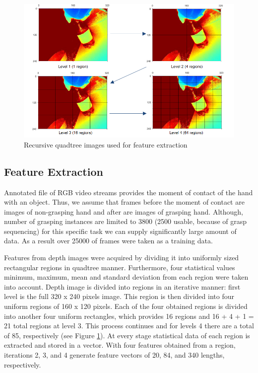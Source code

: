 \documentclass[journal]{IEEEtran}
\begin{document}
\begin{figure}
\includegraphics[scale = 1.09]{Mining}
\caption{Recursive quadtree images used for feature extraction }
\label{fig:Mining}
\centering
\end{figure}



\subsection{Feature Extraction}

Annotated file of RGB video streams provides the moment of contact of the hand with an object. Thus, we assume that frames before the moment of contact are images of non-grasping hand and after are images of grasping hand. Although, number of grasping instances are limited to 3800 (2500 usable, because of grasp sequencing) for this specific task we can supply significantly large amount of data. As a result over 25000 of frames were taken as a training data. 

Features from depth images were acquired by dividing it into uniformly 
sized rectangular regions in quadtree manner. Furthermore, four statistical 
values minimum, maximum, mean and standard deviation from each region were taken 
into account. Depth image is divided into regions in an
iterative manner: first level is the full 320 x 240 pixels image.
This region is then divided into four uniform regions of 160
x 120 pixels. Each of the four obtained regions is divided into
another four uniform rectangles, which provides 16 regions
and 16 + 4 + 1 = 21 total regions at level 3. This process
continues and for levels 4 there are a total of 85, respectively (see Figure 
\ref{fig:Mining}). At every stage
statistical data of each region is extracted and stored in a
vector. With four features obtained from a region, iterations
2, 3, and 4 generate feature vectors of 20, 84, and
340 lengths, respectively.
\end{document}
